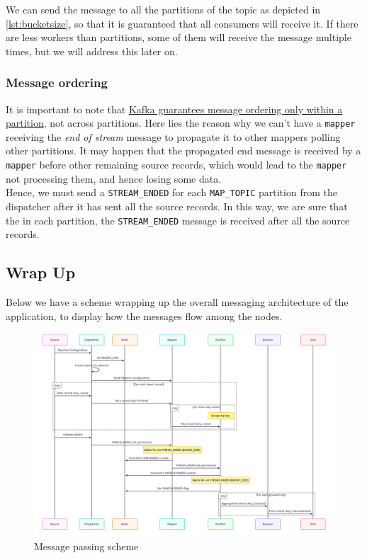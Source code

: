 We can send the message to all the partitions of the topic as depicted in \ref{lst:bucketsize}, so that it is guaranteed that all consumers will receive it. If there are less workers than partitions, some of them will receive the message multiple times, but we will address this later on.

\subsubsection{Message ordering}
It is important to note that \ul{Kafka guarantees message ordering only within a partition}, not across partitions.
Here lies the reason why we can't have a \texttt{mapper} receiving the \textit{end of stream} message to propagate it to other mappers polling other partitions. It may happen that the propagated end message is received by a \texttt{mapper} before other remaining source records, which would lead to the \texttt{mapper} not processing them, and hence losing some data.\\
Hence, we must send a \lstinline|STREAM_ENDED| for each \lstinline|MAP_TOPIC| partition from the dispatcher after it has sent all the source records.
In this way, we are sure that the in each partition, the \lstinline|STREAM_ENDED| message is received after all the source records.

\newpage
\subsection{Wrap Up}
Below we have a scheme wrapping up the overall messaging architecture of the application, to display how the messages flow among the nodes.

\begin{figure}[htbp]
   \centering
   \includegraphics[width=\columnwidth]{images/messagePassing.png}
   \caption{Message passing scheme}
   \label{fig:messagePassing}
\end{figure}

